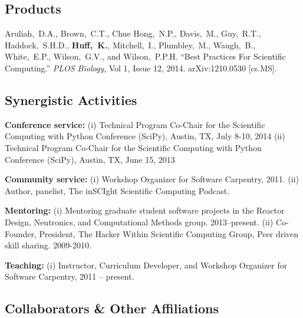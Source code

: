\documentclass[svgnames,11pt]{article}
\begin{document}
\subsection{Products}

\begin{bibenum}[itemsep=5pt]
   \item Aruliah,~D.A., Brown,~C.T., Chue Hong,~N.P., Davis,~M., Guy,~R.T., 
          Haddock,~S.H.D., \textbf{Huff,~K.}, Mitchell,~I., Plumbley,~M., Waugh,~B., 
          White,~E.P., Wilson,~G.V., and Wilson,~P.P.H.  ``Best Practices For 
          Scientific Computing.'' \textsl{PLOS Biology}, Vol 1, Issue 12, 2014. 
          arXiv:1210.0530 [cs.MS].
\end{bibenum}

\subsection{Synergistic Activities}

\begin{bibenum}[itemsep=4pt]

    \item \textbf{Conference service:}
        (i) Technical Program Co-Chair for the Scientific Computing with Python 
        Conference (SciPy), Austin, TX, July 8-10, 2014
        (ii) Technical Program Co-Chair for the Scientific Computing with Python 
        Conference (SciPy), Austin, TX, June 15, 2013

    \item \textbf{Community service:}
        (i) Workshop Organizer for Software Carpentry, 2011.
        (ii) Author, panelist, The inSCIght Scientific Computing Podcast.

    \item \textbf{Mentoring:}
        (i) Mentoring graduate student software projects in the Reactor Design, 
        Neutronics, and Computational Methods group. 2013--present.  
        (ii) Co-Founder, President, The Hacker Within Scientific Computing Group, 
        Peer driven skill sharing. 2009-2010.

    \item \textbf{Teaching:}
        (i) Instructor, Curriculum Developer, and Workshop Organizer for 
        Software Carpentry, 2011 -- present.


\end{bibenum}

\subsection{Collaborators \& Other Affiliations}
\end{document}
